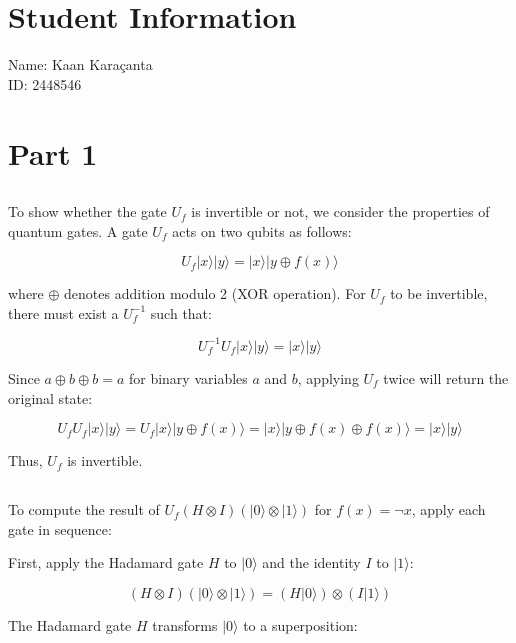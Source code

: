 \documentclass[12pt]{article}
\begin{document}
\section*{Student Information}

Name: Kaan Karaçanta \\

ID: 2448546 \\


\section*{Part 1}

\subsection*{}

To show whether the gate \( U_f \) is invertible or not, we consider the properties of quantum gates. A gate \( U_f \) acts on two qubits as follows:

\[
U_f |x\rangle |y\rangle = |x\rangle |y \oplus f(x)\rangle
\]

where \( \oplus \) denotes addition modulo 2 (XOR operation). For \( U_f \) to be invertible, there must exist a \( U_f^{-1} \) such that:

\[
U_f^{-1}U_f |x\rangle |y\rangle = |x\rangle |y\rangle
\]

Since \( a \oplus b \oplus b = a \) for binary variables \( a \) and \( b \), applying \( U_f \) twice will return the original state:

\[
U_f U_f |x\rangle |y\rangle = U_f |x\rangle |y \oplus f(x)\rangle = |x\rangle |y \oplus f(x) \oplus f(x)\rangle = |x\rangle |y\rangle
\]

Thus, \( U_f \) is invertible.

\subsection*{}

To compute the result of \( U_f (H \otimes I) (|0\rangle \otimes |1\rangle) \) for \( f(x) = \neg x \), apply each gate in sequence:

First, apply the Hadamard gate \( H \) to \( |0\rangle \) and the identity \( I \) to \( |1\rangle \):

\[
(H \otimes I) (|0\rangle \otimes |1\rangle) = (H|0\rangle) \otimes (I|1\rangle)
\]

The Hadamard gate \( H \) transforms \( |0\rangle \) to a superposition:
\end{document}
